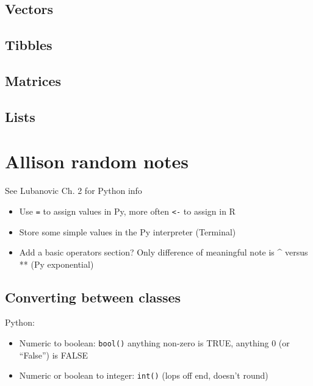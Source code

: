\documentclass[
]{book}
\providecommand{\tightlist}{%
  \setlength{\itemsep}{0pt}\setlength{\parskip}{0pt}}
\begin{document}
\hypertarget{vectors}{%
\subsection{Vectors}\label{vectors}}

\hypertarget{tibbles}{%
\subsection{Tibbles}\label{tibbles}}

\hypertarget{matrices}{%
\subsection{Matrices}\label{matrices}}

\hypertarget{lists}{%
\subsection{Lists}\label{lists}}

\hypertarget{allison-random-notes}{%
\section{Allison random notes}\label{allison-random-notes}}

See Lubanovic Ch. 2 for Python info

\begin{itemize}
\item
  Use \texttt{=} to assign values in Py, more often \texttt{\textless{}-} to assign in R
\item
  Store some simple values in the Py interpreter (Terminal)
\item
  Add a basic operators section? Only difference of meaningful note is \^{} versus ** (Py exponential)
\end{itemize}

\hypertarget{converting-between-classes}{%
\subsection{Converting between classes}\label{converting-between-classes}}

Python:

\begin{itemize}
\tightlist
\item
  Numeric to boolean: \texttt{bool()} anything non-zero is TRUE, anything 0 (or ``False'') is FALSE
\item
  Numeric or boolean to integer: \texttt{int()} (lops off end, doesn't round)
\end{itemize}
\end{document}
